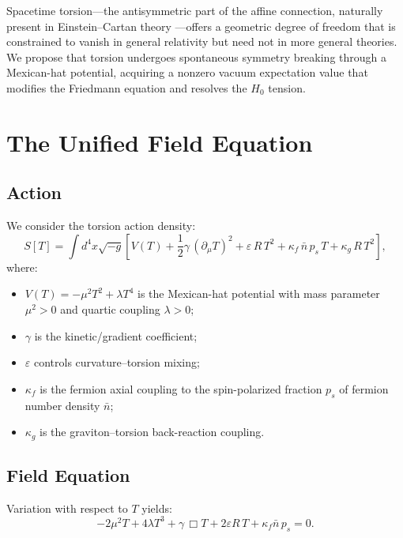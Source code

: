 \documentclass[12pt,preprint]{aastex631}
\begin{document}
Spacetime torsion---the antisymmetric part of the affine connection,
naturally present in Einstein--Cartan theory \citep{Cartan1922,Kibble1961,Sciama1964}---offers
a geometric degree of freedom that is constrained to vanish in
general relativity but need not in more general theories.
We propose that torsion undergoes spontaneous symmetry breaking
through a Mexican-hat potential, acquiring a nonzero vacuum expectation
value that modifies the Friedmann equation and resolves the $H_0$ tension.

\section{The Unified Field Equation}
\label{sec:ufe}

\subsection{Action}

We consider the torsion action density:
\begin{equation}
\label{eq:action}
  S[T] = \int d^4x \sqrt{-g} \left[
    V(T) + \frac{1}{2}\gamma\,(\partial_\mu T)^2
    + \varepsilon\, R\, T^2
    + \kappa_f\, \bar{n}\, p_s\, T
    + \kappa_g\, R\, T^2
  \right],
\end{equation}
where:
\begin{itemize}
  \item $V(T) = -\mu^2 T^2 + \lambda T^4$ is the Mexican-hat potential
    with mass parameter $\mu^2 > 0$ and quartic coupling $\lambda > 0$;
  \item $\gamma$ is the kinetic/gradient coefficient;
  \item $\varepsilon$ controls curvature--torsion mixing;
  \item $\kappa_f$ is the fermion axial coupling to the spin-polarized
    fraction $p_s$ of fermion number density $\bar{n}$;
  \item $\kappa_g$ is the graviton--torsion back-reaction coupling.
\end{itemize}

\subsection{Field Equation}

Variation with respect to $T$ yields:
\begin{equation}
\label{eq:field}
  -2\mu^2 T + 4\lambda T^3 + \gamma\,\Box T
  + 2\varepsilon R\, T + \kappa_f \bar{n}\, p_s = 0.
\end{equation}
\end{document}
